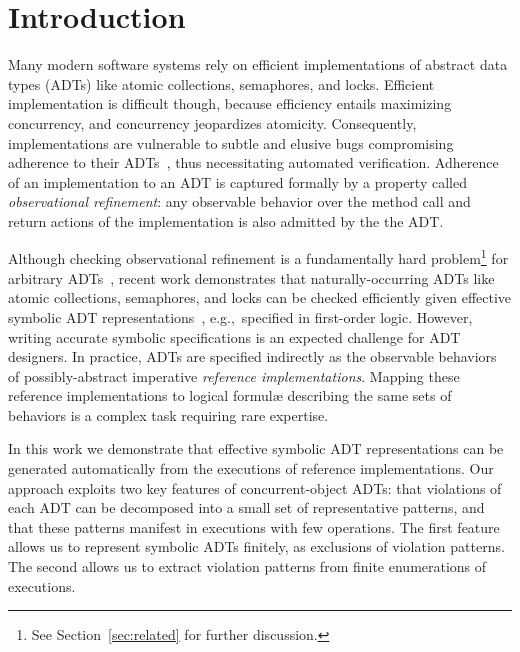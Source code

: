 \section{Introduction}
\label{sec:intro}

Many modern software systems rely on efficient implementations of abstract data
types (ADTs) like atomic collections, semaphores, and locks. Efficient
implementation is difficult though, because efficiency entails maximizing
concurrency, and concurrency jeopardizes atomicity. Consequently,
implementations are vulnerable to subtle and elusive bugs compromising
adherence to their ADTs~\cite{journals/cacm/staff11}, thus necessitating
automated verification. Adherence of an implementation to an ADT is captured
formally by a property called \emph{observational refinement}: any observable
behavior over the method call and return actions of the implementation is also
admitted by the the ADT.

Although checking observational refinement is a fundamentally hard
problem\footnote{See Section~\ref{sec:related} for further discussion.} for
arbitrary ADTs~\cite{journals/siamcomp/GibbonsK97, conf/esop/BouajjaniEEH13},
recent work demonstrates that naturally-occurring ADTs like atomic collections,
semaphores, and locks can be checked efficiently given effective symbolic ADT
representations~\cite{conf/popl/BouajjaniEEH15, journals/arxiv/BouajjaniEEH15,
conf/pldi/EmmiEH15}, e.g.,~specified in first-order logic. However, writing
accurate symbolic specifications is an expected challenge for ADT designers. In
practice, ADTs are specified indirectly as the observable behaviors of
possibly-abstract imperative \emph{reference implementations}. Mapping these
reference implementations to logical formulæ describing the same sets of
behaviors is a complex task requiring rare expertise.

In this work we demonstrate that effective symbolic ADT representations can be
generated automatically from the executions of reference implementations. Our
approach exploits two key features of concurrent-object ADTs: that violations
of each ADT can be decomposed into a small set of representative patterns, and
that these patterns manifest in executions with few operations. The first
feature allows us to represent symbolic ADTs finitely, as exclusions of
violation patterns. The second allows us to extract violation patterns from
finite enumerations of executions.

